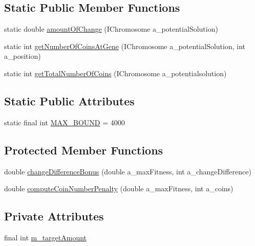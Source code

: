 \subsection*{Static Public Member Functions}
\begin{DoxyCompactItemize}
\item 
static double \hyperlink{classexamples_1_1constraint_1_1_sample_fitness_function_afef33c244dd2ad463b84cb88ed959184}{amount\-Of\-Change} (I\-Chromosome a\-\_\-potential\-Solution)
\item 
static int \hyperlink{classexamples_1_1constraint_1_1_sample_fitness_function_ad9fd0531a5e92191897eb5159c719a69}{get\-Number\-Of\-Coins\-At\-Gene} (I\-Chromosome a\-\_\-potential\-Solution, int a\-\_\-position)
\item 
static int \hyperlink{classexamples_1_1constraint_1_1_sample_fitness_function_a0bdac2f6a4540b206a09e067a63df40c}{get\-Total\-Number\-Of\-Coins} (I\-Chromosome a\-\_\-potentialsolution)
\end{DoxyCompactItemize}
\subsection*{Static Public Attributes}
\begin{DoxyCompactItemize}
\item 
static final int \hyperlink{classexamples_1_1constraint_1_1_sample_fitness_function_abf74607a2c964f86b796e2163b441e01}{M\-A\-X\-\_\-\-B\-O\-U\-N\-D} = 4000
\end{DoxyCompactItemize}
\subsection*{Protected Member Functions}
\begin{DoxyCompactItemize}
\item 
double \hyperlink{classexamples_1_1constraint_1_1_sample_fitness_function_aa03ab975b77017d3334566c40c031fff}{change\-Difference\-Bonus} (double a\-\_\-max\-Fitness, int a\-\_\-change\-Difference)
\item 
double \hyperlink{classexamples_1_1constraint_1_1_sample_fitness_function_a3d75f212b87b23c3ad8f35a8bbe37952}{compute\-Coin\-Number\-Penalty} (double a\-\_\-max\-Fitness, int a\-\_\-coins)
\end{DoxyCompactItemize}
\subsection*{Private Attributes}
\begin{DoxyCompactItemize}
\item 
final int \hyperlink{classexamples_1_1constraint_1_1_sample_fitness_function_a99563b81ff4c6ed2bec9f71f4062a23c}{m\-\_\-target\-Amount}
\end{DoxyCompactItemize}

